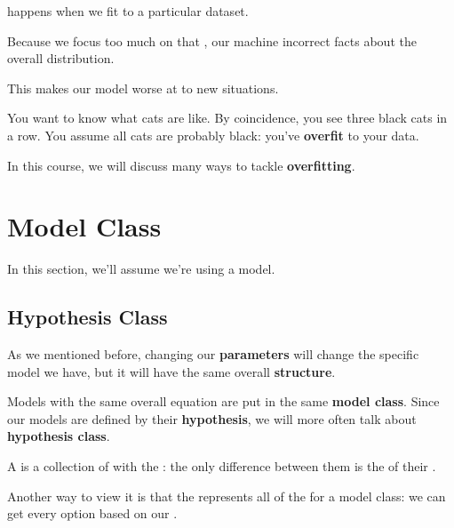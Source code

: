         \begin{definition}
             happens when we fit  to a particular dataset. 
            
            Because we focus too much on that , our machine  incorrect facts about the overall distribution. 
            
             This makes our model worse at  to new situations.
        \end{definition}
        
        \miniex You want to know what cats are like. By coincidence, you see three black cats in a row. You assume all cats are probably black: you've \textbf{overfit} to your data.
        
        In this course, we will discuss many ways to tackle \textbf{overfitting}.


\pagebreak

\section{Model Class}

    In this section, we'll assume we're using a model. 
    
    \subsection{Hypothesis Class}
    
        As we mentioned before, changing our \textbf{parameters} will change the specific model we have, but it will have the same overall \textbf{structure}.
        
        Models with the same overall equation are put in the same \textbf{model class}. Since our models are defined by their \textbf{hypothesis}, we will more often talk about \textbf{hypothesis class}.\\
        
        \begin{definition}
            A  is a collection of  with the : the only difference between them is the  of their .
            
            Another way to view it is that the  represents all of the  for a model class: we can get every option based on our .
        \end{definition}
        
